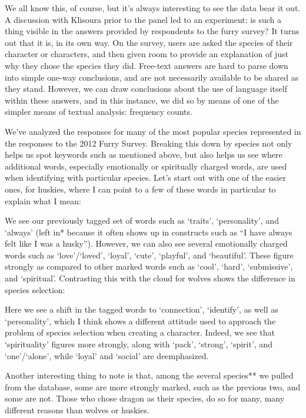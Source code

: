 We all know this, of course, but it's always interesting to see the data bear it out. A discussion with Klisoura prior to the panel led to an experiment: is such a thing visible in the answers provided by respondents to the furry survey? It turns out that it is, in its own way. On the survey, users are asked the species of their character or characters, and then given room to provide an explanation of just why they chose the species they did. Free-text answers are hard to parse down into simple one-way conclusions, and are not necessarily available to be shared as they stand. However, we can draw conclusions about the use of language itself within these answers, and in this instance, we did so by means of one of the simpler means of textual analysis: frequency counts.

We've analyzed the responses for many of the most popular species represented in the responses to the 2012 Furry Survey. Breaking this down by species not only helps us spot keywords such as mentioned above, but also helps us see where additional words, especially emotionally or spiritually charged words, are used when identifying with particular species. Let's start out with one of the easier ones, for huskies, where I can point to a few of these words in particular to explain what I mean:

We see our previously tagged set of words such as `traits', `personality', and `always' (left in* because it often shows up in constructs such as ``I have always felt like I was a husky''). However, we can also see several emotionally charged words such as `love'/`loved', `loyal', `cute', `playful', and `beautiful'. These figure strongly as compared to other marked words such as `cool', `hard', `submissive', and `spiritual'. Contrasting this with the cloud for wolves shows the difference in species selection:

Here we see a shift in the tagged words to `connection', `identify', as well as `personality', which I think shows a different attitude used to approach the problem of species selection when creating a character. Indeed, we see that `spirituality' figures more strongly, along with `pack', `strong', `spirit', and `one'/`alone', while `loyal' and `social' are deemphasized.

Another interesting thing to note is that, among the several species** we pulled from the database, some are more strongly marked, such as the previous two, and some are not. Those who chose dragon as their species, do so for many, many different reasons than wolves or huskies.

